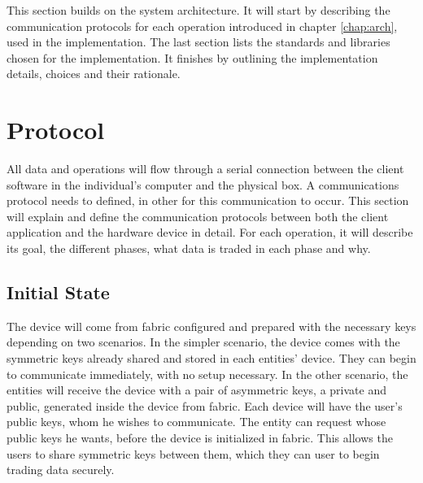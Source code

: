 \cleardoublepage
\label{chap:implementation}

This section builds on the system architecture. It will start by describing the communication protocols for each operation introduced in chapter \ref{chap:arch}, used in the implementation. The last section lists the standards and libraries chosen for the implementation. It finishes by outlining the implementation details, choices and their rationale.

\section{Protocol}\label{chap:implementation:protocol}

All data and operations will flow through a serial connection between the client software in the individual's computer and the physical box. A communications protocol needs to defined, in other for this communication to occur.
This section will explain and define the communication protocols between both the client application and the hardware device in detail. For each operation, it will describe its goal, the different phases, what data is traded in each phase and why.

\subsection{Initial State}\label{chap:implementation:protocol:initial-state}

The device will come from fabric configured and prepared with the necessary keys depending on two scenarios. In the simpler scenario, the device comes with the symmetric keys already shared and stored in each entities' device. They can begin to communicate immediately, with no setup necessary.
In the other scenario, the entities will receive the device with a pair of asymmetric keys, a private and public, generated inside the device from fabric. Each device will have the user's public keys, whom he wishes to communicate. The entity can request whose public keys he wants, before the device is initialized in fabric. This allows the users to share symmetric keys between them, which they can user to begin trading data securely.

